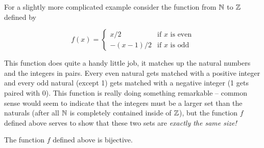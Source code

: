 For a slightly more complicated example 
consider the function from ${\mathbb N}$ to ${\mathbb Z}$ defined by

\[ f(x) = \left\{ \begin{array}{cl} x/2 & \mbox{if $x$ is even} \\ -(x-1)/2 & \mbox{if $x$ is odd} \end{array} \right. \]

This function does quite a handy little job, it matches up the natural
numbers and the integers in pairs.  Every even natural gets matched with
a positive integer and every odd natural (except 1) gets matched with a 
negative integer (1 gets paired with 0).  This function is really doing 
something remarkable -- common sense would seem to indicate that the integers
must be a larger set than the naturals (after all ${\mathbb N}$ is completely
contained inside of ${\mathbb Z}$), but the function $f$ defined above serves
to show that these two sets are \emph{exactly the same size!}

\begin{thm}
The function $f$ defined above is bijective.
\end{thm}

